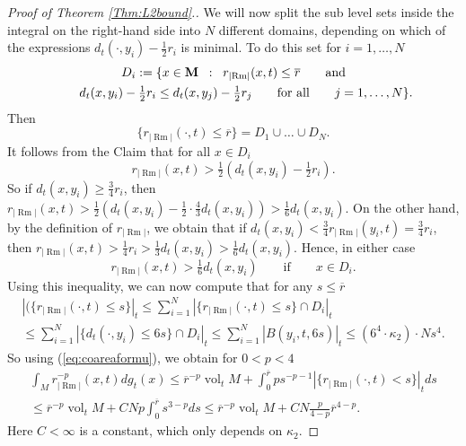 \documentclass[11pt]{amsart}
\numberwithin{equation}{section}
\def\M{{\bf M}}
\DeclareMathOperator{\Rm}{Rm}
\DeclareMathOperator{\vol}{vol}
\newcommand{\rrm}{r_{|{\Rm}|}}
\numberwithin{equation}{section}
\begin{document}
\begin{proof}[Proof of Theorem \ref{Thm:L2bound}.]
We will now split the sub level sets inside the integral on the right-hand side into $N$ different domains, depending on which of the expressions $d_t( \cdot, y_i) - \frac12 r_i$ is minimal.
To do this set for $i = 1, \ldots, N$
\begin{multline*}
 D_i := \{ x \in \M \;\; : \;\; \rrm (x,t) \leq \overline{r} \qquad  \text{and} \\ \qquad d_t(x, y_i) - \tfrac12 r_i \leq d_t (x, y_j) - \tfrac12 r_j \qquad \text{for all} \qquad j = 1, \ldots, N \}.
\end{multline*}
Then
\begin{equation} \label{eq:DicoverB}
  \{ \rrm (\cdot, t) \leq \overline{r} \} = D_1 \cup \ldots \cup D_N. 
\end{equation}
It follows from the Claim that for all $x \in D_i$
\[ \rrm (x,t) > \tfrac12 ( d_t (x, y_i) - \tfrac12 r_i ) . \]
So if $d_t (x, y_i) \geq \tfrac34 r_i$, then $\rrm (x,t) > \frac12 (d_t (x, y_i) - \frac12 \cdot \frac43 d_t (x, y_i)) > \tfrac16 d_t (x, y_i)$.
On the other hand, by the definition of $\rrm$, we obtain that if $d_t (x, y_i ) < \tfrac34 \rrm (y_i, t) = \tfrac34 r_i$, then $\rrm (x, t) > \tfrac14 r_i > \frac13 d_t (x, y_i) > \frac16 d_t (x, y_i)$.
Hence, in either case
\begin{equation} \label{eq:rrm>16d}
 \rrm (x, t) > \tfrac16 d_t (x, y_i) \qquad \text{if} \qquad x \in D_i. 
\end{equation}
Using this inequality, we can now compute that for any $s \leq \overline{r}$
\begin{multline} \label{eq:areabound}
 | (\{ \rrm (\cdot, t) \leq s \} |_t \leq \sum_{i = 1}^N | \{ \rrm (\cdot, t) \leq s \} \cap D_i |_t \\
 \leq \sum_{i = 1}^N | \{ d_t (\cdot, y_i) \leq 6 s \} \cap D_i |_t \leq \sum_{i=1}^N | B( y_i, t, 6s) |_t \leq (6^4 \cdot \kappa_2) \cdot N s^4.
\end{multline}
So using (\ref{eq:coareaformu}), we obtain for $0 < p < 4$
\begin{multline}
\label{eq:NdependentLponrrm}  
 \int_M \rrm^{-p} (x, t)  dg_t(x) \leq \overline{r}^{-p} \vol_t M + \int_0^{\overline r} p s^{-p - 1} | \{ \rrm (\cdot, t) < s \} |_t  ds \\
 \leq \overline{r}^{-p} \vol_t M  + C N p \int_0^{\overline{r}} s^{3-p} ds \leq \overline{r}^{-p} \vol_t M + CN \frac{p}{4-p} \overline{r}^{4-p}.
\end{multline}
Here $C < \infty$ is a constant, which only depends on $\kappa_2$.


\end{proof}
\end{document}
